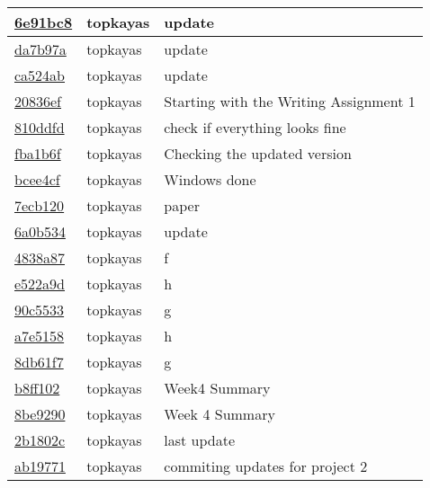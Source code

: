 \begin{tabular}{l l l}
\href{git@github.com:topkayas/CS444/commit/6e91bc83dea6dbe8f7916dccd0ed4969bbcdf2c4}{6e91bc8} & topkayas & update\\\hline
\href{git@github.com:topkayas/CS444/commit/da7b97ae1b38f767f211432d63b1cb1535208377}{da7b97a} & topkayas & update\\\hline
\href{git@github.com:topkayas/CS444/commit/ca524ab7c929dc1e7d0e977ce1d2e19452e40718}{ca524ab} & topkayas & update\\\hline
\href{git@github.com:topkayas/CS444/commit/20836ef8a96f97bfcfe0d8a01f4e0aeaaeb7438b}{20836ef} & topkayas & Starting with the Writing Assignment 1\\\hline
\href{git@github.com:topkayas/CS444/commit/810ddfde1cd5aff5b3973e41f92779faff0bde06}{810ddfd} & topkayas & check if everything looks fine\\\hline
\href{git@github.com:topkayas/CS444/commit/fba1b6f752edb17e9a05c9e74bc2b4df7f14f1c8}{fba1b6f} & topkayas & Checking the updated version\\\hline
\href{git@github.com:topkayas/CS444/commit/bcee4cf40b3a2945e795c81d45184fbc51806cd7}{bcee4cf} & topkayas & Windows done\\\hline
\href{git@github.com:topkayas/CS444/commit/7ecb120b31b8d85b1c441e9fcc72113e5bc0dcc5}{7ecb120} & topkayas & paper\\\hline
\href{git@github.com:topkayas/CS444/commit/6a0b5342ec1ed581ddbe751da36483ff4a391cb1}{6a0b534} & topkayas & update\\\hline
\href{git@github.com:topkayas/CS444/commit/4838a87c6da32de64b3434de11996b7fb3c2ded6}{4838a87} & topkayas & f\\\hline
\href{git@github.com:topkayas/CS444/commit/e522a9db42f957b862b5a4a6883dc96ebe12a5af}{e522a9d} & topkayas & h\\\hline
\href{git@github.com:topkayas/CS444/commit/90c55337881a81dc960a6e5cce07e2aadc7dca57}{90c5533} & topkayas & g\\\hline
\href{git@github.com:topkayas/CS444/commit/a7e5158a71a2e21d8965232d7f966d84c58b4925}{a7e5158} & topkayas & h\\\hline
\href{git@github.com:topkayas/CS444/commit/8db61f790d72db60a0079bdea7ea90b2c7db6872}{8db61f7} & topkayas & g\\\hline
\href{git@github.com:topkayas/CS444/commit/b8ff1022d12b6742cebcb54378369ff782dac89f}{b8ff102} & topkayas & Week4 Summary\\\hline
\href{git@github.com:topkayas/CS444/commit/8be92908e659605ebe7f457758fb51036d05dbef}{8be9290} & topkayas & Week 4 Summary\\\hline
\href{git@github.com:topkayas/CS444/commit/2b1802c27d1698a16d0af379c06764c9615671ca}{2b1802c} & topkayas & last update\\\hline
\href{git@github.com:topkayas/CS444/commit/ab19771e084bd55e0b12ca6d5240ca33f1461146}{ab19771} & topkayas & commiting updates for project 2\\\hline\end{tabular}
